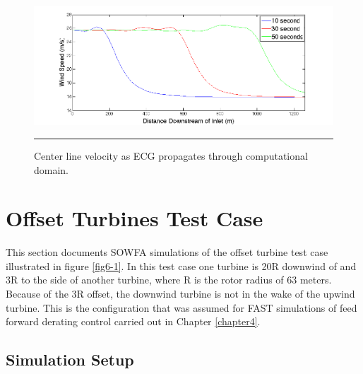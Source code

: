 \begin{figure}[htbp] \label{fig6-12}
	\centering
		\includegraphics[trim = {1cm 0 2cm 0}, clip, width = \linewidth]{Figures/ch6Figures/fig6-12.png}
		\rule{35em}{0.5pt}
	\caption{Center line velocity as ECG propagates through computational domain.}
\end{figure}

\section{Offset Turbines Test Case} \label{section6-6}

This section documents SOWFA simulations of the offset turbine test case illustrated in figure \ref{fig6-1}. In this test case one turbine is 20R downwind of and 3R to the side of another turbine, where R is the rotor radius of 63 meters. Because of the 3R offset, the downwind turbine is not in the wake of the upwind turbine. This is the configuration that was assumed for FAST simulations of feed forward derating control carried out in Chapter \ref{chapter4}. 


\subsection{Simulation Setup} \label{section6-6-1}


